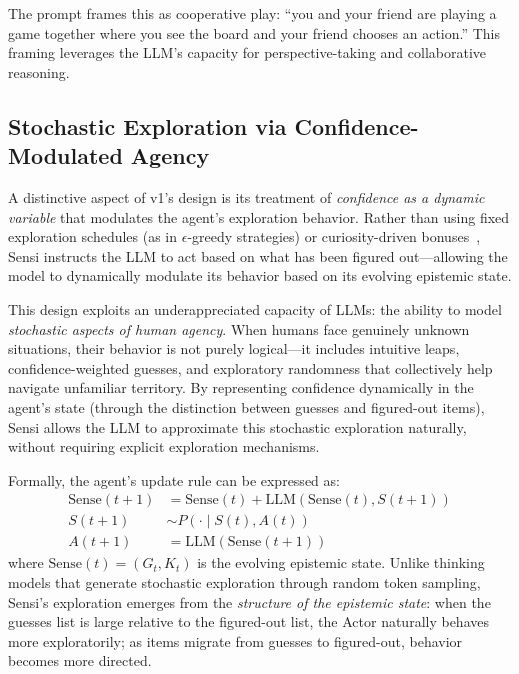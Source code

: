 \documentclass[11pt,letterpaper]{article}
\begin{document}
The prompt frames this as cooperative play: ``you and your friend are playing a game together where you see the board and your friend chooses an action.'' This framing leverages the LLM's capacity for perspective-taking and collaborative reasoning.

\subsection{Stochastic Exploration via Confidence-Modulated Agency}
\label{sec:stochastic}

A distinctive aspect of v1's design is its treatment of \emph{confidence as a dynamic variable} that modulates the agent's exploration behavior. Rather than using fixed exploration schedules (as in $\epsilon$-greedy strategies) or curiosity-driven bonuses~\citep{pathak2017curiosity,schmidhuber1991curious}, Sensi instructs the LLM to act based on what has been figured out---allowing the model to dynamically modulate its behavior based on its evolving epistemic state.

This design exploits an underappreciated capacity of LLMs: the ability to model \emph{stochastic aspects of human agency}. When humans face genuinely unknown situations, their behavior is not purely logical---it includes intuitive leaps, confidence-weighted guesses, and exploratory randomness that collectively help navigate unfamiliar territory. By representing confidence dynamically in the agent's state (through the distinction between guesses and figured-out items), Sensi allows the LLM to approximate this stochastic exploration naturally, without requiring explicit exploration mechanisms.

Formally, the agent's update rule can be expressed as:
\begin{align}
  \text{Sense}(t+1) &= \text{Sense}(t) + \text{LLM}(\text{Sense}(t), S(t+1)) \\
  S(t+1) &\sim P(\cdot \mid S(t), A(t)) \\
  A(t+1) &= \text{LLM}(\text{Sense}(t+1))
\end{align}
where $\text{Sense}(t) = (G_t, K_t)$ is the evolving epistemic state. Unlike thinking models that generate stochastic exploration through random token sampling, Sensi's exploration emerges from the \emph{structure of the epistemic state}: when the guesses list is large relative to the figured-out list, the Actor naturally behaves more exploratorily; as items migrate from guesses to figured-out, behavior becomes more directed.
\end{document}
